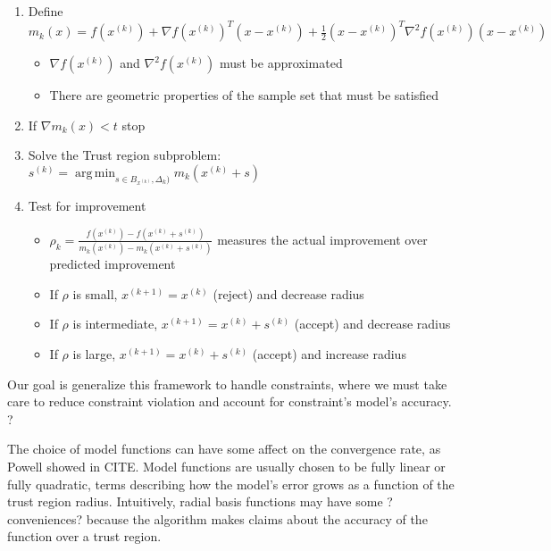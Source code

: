 \documentclass{article}
\DeclareMathOperator*{\argmin}{arg\,min}
\begin{document}
\begin{enumerate}
	\item Define $m_k(x) = f(x^{(k)}) + \nabla f(x^{(k)})^T (x-x^{(k)}) + \frac 1 2 (x-x^{(k)})^T\nabla^2f(x^{(k)})(x-x^{(k)})$
	\begin{itemize}
		\item $\nabla f(x^{(k)})$ and $\nabla^2 f(x^{(k)})$ must be approximated
		\item There are geometric properties of the sample set that must be satisfied
	\end{itemize}
	\item If $\nabla m_k(x) < t$ stop
	\item Solve the Trust region subproblem: $s^{(k)} = \argmin_{s\in B_{x^{(k)}}, \Delta_k)} m_k(x^{(k)} + s)$
	\item Test for improvement
	\begin{itemize}
		\item $\rho_k = \frac{f(x^{(k)}) - f(x^{(k)}+s^{(k)})}{m_k(x^{(k)}) - m_k(x^{(k)}+s^{(k)})}$ measures the actual improvement over predicted improvement
		\item If $\rho$ is small, $x^{(k+1)}=x^{(k)}$ (reject) and decrease radius
		\item If $\rho$ is intermediate, $x^{(k+1)}=x^{(k)}+s^{(k)}$ (accept) and decrease radius
		\item If $\rho$ is large, $x^{(k+1)}=x^{(k)}+s^{(k)}$ (accept) and increase radius
	\end{itemize}
\end{enumerate}

Our goal is generalize this framework to handle constraints, where we must take care to reduce constraint violation and account for constraint's model's accuracy.
?

The choice of model functions can have some affect on the convergence rate, as Powell showed in CITE.
Model functions are usually chosen to be fully linear or fully quadratic, terms describing how the model's error grows as a function of the trust region radius.
Intuitively, radial basis functions may have some ?conveniences? because the algorithm makes claims about the accuracy of the function over a trust region.


\end{document}
